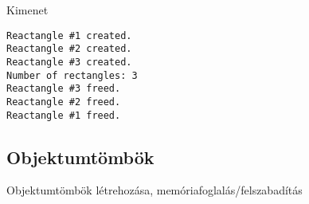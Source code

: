 \documentclass[usenames,dvipsnames,aspectratio=169]{beamer}
\begin{document}
\begin{frame}
    \begin{exampleblock}{}
        \vspace{-.3cm}
        \scriptsize
        
        
        \vspace{-.3cm}
    \end{exampleblock}
\end{frame}

\begin{frame}[fragile]
    \begin{exampleblock}{}
        \scriptsize
        
    \end{exampleblock}
    \begin{block}{Kimenet}
        \scriptsize
        \vspace{-.3cm}
        \begin{verbatim}
Reactangle #1 created.
Reactangle #2 created.
Reactangle #3 created.
Number of rectangles: 3
Reactangle #3 freed.
Reactangle #2 freed.
Reactangle #1 freed.
\end{verbatim}
\vspace{-.3cm}
    \end{block}
\end{frame}

\subsection{Objektumtömbök}

\begin{frame}
    Objektumtömbök létrehozása, memóriafoglalás/felszabadítás
    \begin{exampleblock}{}
        \scriptsize
        
    \end{exampleblock}
\end{frame}

\begin{frame}
    \begin{exampleblock}{}
        \scriptsize
        
    \end{exampleblock}
\end{frame}
\end{document}
